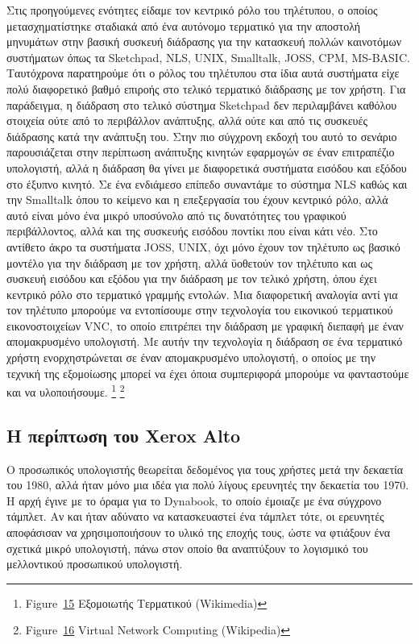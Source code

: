 \documentclass[
]{article}
\begin{document}
Στις προηγούμενες ενότητες είδαμε τον κεντρικό ρόλο του τηλέτυπου, ο
οποίος μετασχηματίστηκε σταδιακά από ένα αυτόνομο τερματικό για την
αποστολή μηνυμάτων στην βασική συσκευή διάδρασης για την κατασκευή
πολλών καινοτόμων συστήματων όπως τα Sketchpad, NLS, UNIX, Smalltalk,
JOSS, CPM, MS-BASIC. Ταυτόχρονα παρατηρούμε ότι ο ρόλος του τηλέτυπου
στα ίδια αυτά συστήματα είχε πολύ διαφορετικό βαθμό επιροής στο τελικό
τερματικό διάδρασης με τον χρήστη. Για παράδειγμα, η διάδραση στο τελικό
σύστημα Sketchpad δεν περιλαμβάνει καθόλου στοιχεία ούτε από το
περιβάλλον ανάπτυξης, αλλά ούτε και από τις συσκευές διάδρασης κατά την
ανάπτυξη του. Στην πιο σύγχρονη εκδοχή του αυτό το σενάριο παρουσιάζεται
στην περίπτωση ανάπτυξης κινητών εφαρμογών σε έναν επιτραπέζιο
υπολογιστή, αλλά η διάδραση θα γίνει με διαφορετικά συστήματα εισόδου
και εξόδου στο έξυπνο κινητό. Σε ένα ενδιάμεσο επίπεδο συναντάμε το
σύστημα NLS καθώς και την Smalltalk όπου το κείμενο και η επεξεργασία
του έχουν κεντρικό ρόλο, αλλά αυτό είναι μόνο ένα μικρό υποσύνολο από
τις δυνατότητες του γραφικού περιβάλλοντος, αλλά και της συσκευής
εισόδου ποντίκι που είναι κάτι νέο. Στο αντίθετο άκρο τα συστήματα JOSS,
UNIX, όχι μόνο έχουν τον τηλέτυπο ως βασικό μοντέλο για την διάδραση με
τον χρήστη, αλλά ϋοθετούν τον τηλέτυπο και ως συσκευή εισόδου και εξόδου
για την διάδραση με τον τελικό χρήστη, όπου έχει κεντρικό ρόλο στο
τερματικό γραμμής εντολών. Μια διαφορετική αναλογία αντί για τον
τηλέτυπο μπορούμε να εντοπίσουμε στην τεχνολογία του εικονικού
τερματικού εικονοστοιχείων VNC, το οποίο επιτρέπει την διάδραση με
γραφική διεπαφή με έναν απομακρυσμένο υπολογιστή. Με αυτήν την
τεχνολογία η διάδραση σε ένα τερματικό χρήστη ενορχηστρώνεται σε έναν
απομακρυσμένο υπολογιστή, ο οποίος με την τεχνική της εξομοίωσης μπορεί
να έχει όποια συμπεριφορά μπορούμε να φανταστούμε και να υλοποιήσουμε.
\footnote{Figure~\protect\hyperlink{fig:terminal-emulator}{15}
  Εξομοιωτής Τερματικού (Wikimedia)} \footnote{Figure~\protect\hyperlink{fig:vnc}{16}
  Virtual Network Computing (Wikipedia)}

\hypertarget{ux3b7-ux3c0ux3b5ux3c1ux3afux3c0ux3c4ux3c9ux3c3ux3b7-ux3c4ux3bfux3c5-xerox-alto}{%
\subsection{Η περίπτωση του Xerox
Alto}\label{ux3b7-ux3c0ux3b5ux3c1ux3afux3c0ux3c4ux3c9ux3c3ux3b7-ux3c4ux3bfux3c5-xerox-alto}}

Ο προσωπικός υπολογιστής θεωρείται δεδομένος για τους χρήστες μετά την
δεκαετία του 1980, αλλά ήταν μόνο μια ιδέα για πολύ λίγους ερευνητές την
δεκαετία του 1970. Η αρχή έγινε με το όραμα για το Dynabook, το οποίο
έμοιαζε με ένα σύγχρονο τάμπλετ. Αν και ήταν αδύνατο να κατασκευαστεί
ένα τάμπλετ τότε, οι ερευνητές αποφάσισαν να χρησιμοποιήσουν το υλικό
της εποχής τους, ώστε να φτιάξουν ένα σχετικά μικρό υπολογιστή, πάνω
στον οποίο θα αναπτύξουν το λογισμικό του μελλοντικού προσωπικού
υπολογιστή.
\end{document}
